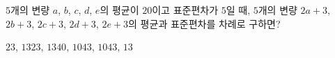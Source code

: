 $5$개의 변량 $a$, $b$, $c$, $d$, $e$의 평균이 $20$이고 표준편차가 $5$일 때, $5$개의 변량 $2a+3$, $2b+3$, $2c+3$, $2d+3$, $2e+3$의 평균과 표준편차를 차례로 구하면?
\begin{choices32}{$23$, $13$}{$23$, $13$}{$40$, $10$}{$43$, $10$}{$43$, $13$}\end{choices32}
